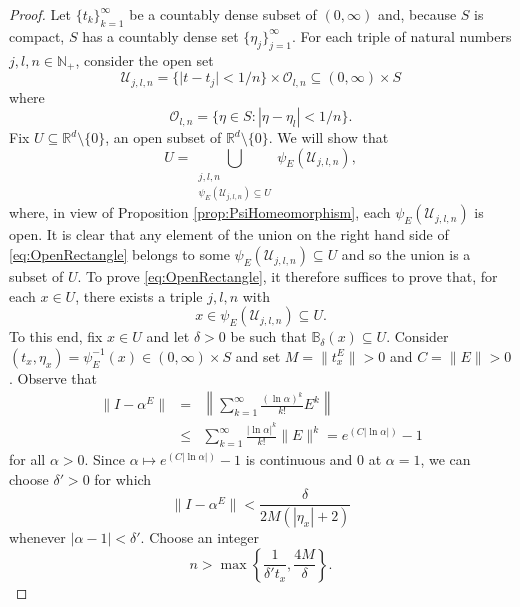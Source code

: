 \documentclass[11pt]{article}
\begin{document}
\begin{proof}
Let $\{t_k\}_{k=1}^\infty$ be a countably dense subset of $(0,\infty)$ and, because $S$ is compact, $S$ has a countably dense set $\{\eta_j\}_{j=1}^\infty$.  For each triple of natural numbers $j,l,n\in\mathbb{N}_+$, consider the open set
\begin{equation*}
\mathcal{U}_{j,l,n}=\{ \vert t - t_j \vert < 1/n \}\times \mathcal{O}_{l,n}\subseteq (0,\infty)\times S
\end{equation*}
where
\begin{equation*}
\mathcal{O}_{l,n}=\{\eta\in S: |\eta-\eta_l|<1/n\}.
\end{equation*}
Fix $U\subseteq \mathbb{R}^d\setminus \{0\}$, an open subset of $\mathbb{R}^d\setminus\{0\}$. We will show that
\begin{equation}\label{eq:OpenRectangle}
U=\bigcup_{\substack{j,l,n\\ \psi_E(\mathcal{U}_{j,l,n})\subseteq U}}\psi_E(\mathcal{U}_{j,l,n}),
\end{equation}
where, in view of Proposition \ref{prop:PsiHomeomorphism}, each $\psi_E(\mathcal{U}_{j,l,n})$ is open. It is clear that any element of the union on the right hand side of \eqref{eq:OpenRectangle} belongs to some $\psi_E(\mathcal{U}_{j,l,n}) \subseteq U$ and so the union is a subset of $U$. To prove \eqref{eq:OpenRectangle}, it therefore suffices to prove that, for each $x\in U$, there exists a triple $j,l,n$ with
\begin{equation*}
x\in\psi_E(\mathcal{U}_{j,l,n})\subseteq U.
\end{equation*}
To this end, fix $x\in U$ and let $\delta>0$ be such that $\mathbb{B}_\delta(x)\subseteq U$. Consider $(t_x,\eta_x)=\psi_E^{-1}(x)\in (0,\infty)\times S$ and set $M=\|t_x^E\|>0$ and $C=\|E\|>0$. Observe that 
\begin{eqnarray*}
\|I-\alpha^E\|&=&\left\|\sum_{k=1}^\infty \frac{(\ln \alpha)^k}{k!} E^k\right\|\\
&\leq &\sum_{k=1}^\infty \frac{|\ln \alpha|^k}{k!} \|E\|^k=e^{(C|\ln \alpha|)}-1
\end{eqnarray*}
for all $\alpha>0$. Since $\alpha\mapsto e^{(C|\ln \alpha|)}-1$ is continuous and $0$ at $\alpha=1$, we can choose $\delta'>0$ for which
\begin{equation*}
\|I-\alpha ^E\|< \frac{\delta}{2M (  |\eta_x|+2)}
\end{equation*}
whenever $|\alpha-1|<\delta'$. Choose an integer
\begin{equation*}
n>\max \left\{\frac{1}{\delta't_x}, \frac{4 M }{\delta}\right\}.

\end{equation*}
\end{proof}
\end{document}
